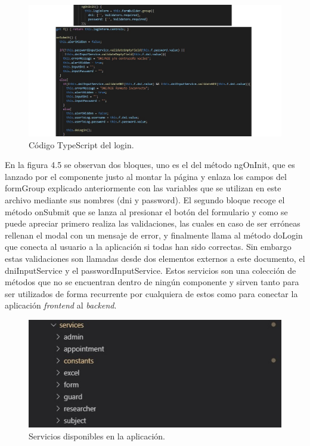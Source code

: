     \begin{figure}[h]
    \centering
     \includegraphics[width=1\textwidth]{images/loginTS.jpg}
    \caption{Código TypeScript del login.}
    \end{figure}
    \FloatBarrier
    
    En la figura 4.5 se observan dos bloques, uno es el del método ngOnInit, que es lanzado por el componente justo al montar la página y enlaza los campos del formGroup explicado anteriormente con las variables que se utilizan en este archivo mediante sus nombres (dni y password). El segundo bloque recoge el método onSubmit que se lanza al presionar el botón del formulario y como se puede apreciar primero realiza las validaciones, las cuales en caso de ser erróneas rellenan el modal con un mensaje de error, y finalmente llama al método doLogin que conecta al usuario a la aplicación si todas han sido correctas. Sin embargo estas validaciones son llamadas desde dos elementos externos a este documento, el dniInputService y el passwordInputService. Estos servicios son una colección de métodos que no se encuentran dentro de ningún componente y  sirven tanto para ser utilizados de forma recurrente por cualquiera de estos como para conectar la aplicación \textit{frontend} al \textit{backend}.
    
    \begin{figure}[h]
    \centering
     \includegraphics[width=1\textwidth]{images/services.jpg}
    \caption{Servicios disponibles en la aplicación.}
    \end{figure}
    \FloatBarrier
    
